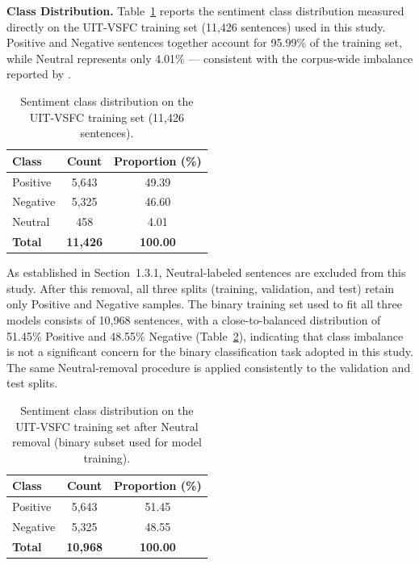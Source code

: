 \documentclass[12pt]{report} %
\begin{document}
\textbf{Class Distribution.} Table~\ref{tab:uitvsfc-train-dist} reports the sentiment class distribution measured directly on the UIT-VSFC training set (11,426 sentences) used in this study. Positive and Negative sentences together account for 95.99\% of the training set, while Neutral represents only 4.01\% --- consistent with the corpus-wide imbalance reported by \cite{nguyen2018uitvsfc}.

\begin{table}[htbp]
    \centering
    \caption{Sentiment class distribution on the UIT-VSFC training set (11,426 sentences).}
    \label{tab:uitvsfc-train-dist}
    \begin{tabular}{lcc}
        \hline
        \textbf{Class} & \textbf{Count}  & \textbf{Proportion (\%)} \\
        \hline
        Positive       & 5,643           & 49.39                    \\
        Negative       & 5,325           & 46.60                    \\
        Neutral        & 458             & 4.01                     \\
        \hline
        \textbf{Total} & \textbf{11,426} & \textbf{100.00}          \\
        \hline
    \end{tabular}
\end{table}

As established in Section~1.3.1, Neutral-labeled sentences are excluded from this study. After this removal, all three splits (training, validation, and test) retain only Positive and Negative samples. The binary training set used to fit all three models consists of 10,968 sentences, with a close-to-balanced distribution of 51.45\% Positive and 48.55\% Negative (Table~\ref{tab:uitvsfc-train-binary-dist}), indicating that class imbalance is not a significant concern for the binary classification task adopted in this study. The same Neutral-removal procedure is applied consistently to the validation and test splits.

\begin{table}[htbp]
    \centering
    \caption{Sentiment class distribution on the UIT-VSFC training set after Neutral removal (binary subset used for model training).}
    \label{tab:uitvsfc-train-binary-dist}
    \begin{tabular}{lcc}
        \hline
        \textbf{Class} & \textbf{Count}  & \textbf{Proportion (\%)} \\
        \hline
        Positive       & 5,643           & 51.45                    \\
        Negative       & 5,325           & 48.55                    \\
        \hline
        \textbf{Total} & \textbf{10,968} & \textbf{100.00}          \\
        \hline
    \end{tabular}
\end{table}
\end{document}
